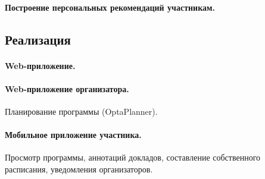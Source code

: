 \documentclass[12pt,oneside]{article}
\begin{document}
\paragraph{Построение персональных рекомендаций участникам.}


\subsection{Реализация}
\paragraph{Web-приложение.}
\paragraph{Web-приложение организатора.}
Планирование программы (OptaPlanner).
\paragraph{Мобильное приложение участника.} Просмотр программы, аннотаций докладов, составление собственного расписания, уведомления организаторов.
\end{document}
